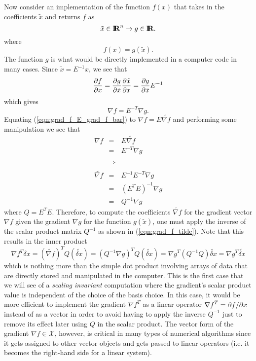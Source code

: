 Now consider an implementation of the function $f(x)$ that takes in the coefficients
$\tilde{x}$ and returns $f$ as
%
\[
\tilde{x}\in\mbox{\textbf{I}}\hspace{-0.6ex}\mbox{\textbf{R}}^n \rightarrow g\in\mbox{\textbf{I}}\hspace{-0.6ex}\mbox{\textbf{R}}.
\]
%
where
%
\[
f(x) = g(\tilde{x}).
\]
%
The function $g$ is what would be directly implemented in a computer code in
many cases.  Since $\tilde{x} = E^{-1} x$, we see that
%
\[
\displaystyle{\frac{\partial f}{\partial x}} = \displaystyle{\frac{\partial g}{\partial \tilde{x}}} \displaystyle{\frac{\partial \tilde{x}}{\partial x}}  = \displaystyle{\frac{\partial g}{\partial \tilde{x}}} E^{-1}
\]
%
which gives
%
\begin{equation}
\nabla f = E^{-T} \nabla g.
\label{eqn:grad_f_E_grad_f_bar}
\end{equation}
%
Equating (\ref{eqn:grad_f_E_grad_f_bar}) to $\nabla f = E {}\tilde{\nabla f}$
and performing some manipulation we see that
%
\begin{eqnarray}
\nabla f
& = & E \tilde{\nabla f} \nonumber \\
& = & E^{-T} \nabla g \nonumber \\
& & \nonumber \\
& \Rightarrow & \nonumber \\
& & \nonumber \\
\tilde{\nabla f}
& = & E^{-1} E^{-T} \nabla g \nonumber \\
& = & (E^T E)^{-1} \nabla g \nonumber \\
& = & {Q}^{-1} \nabla g
\label{eqn:grad_f_tilde}
\end{eqnarray}
%
where $Q = E^T E$.  Therefore, to compute the coefficients
$\tilde{\nabla f}$ for the gradient vector $\nabla f$ given the gradient
$\nabla g$ for the function $g(\tilde{x})$, one must apply the inverse of the
scalar product matrix $Q^{-1}$ as shown in
(\ref{eqn:grad_f_tilde}).  Note that this results in the inner product
%
\[
{\nabla f}^T \delta x = (\tilde{\nabla f})^T Q (\tilde{\delta x})
= ({Q}^{-1} {\nabla g})^T Q (\tilde{\delta x})
= {\nabla g}^T ( {Q}^{-1} Q ) \tilde{\delta x}
= {\nabla g}^T \tilde{\delta x}
\]
%
which is nothing more than the simple dot product involving arrays of data
that are directly stored and manipulated in the computer.  This is the first
case that we will see of a {}\textit{scaling invariant} computation where the
gradient's scalar product value is independent of the choice of the basis
choice.  In this case, it would be more efficient to implement the gradient
${\nabla f}^T$ as a linear operator ${\nabla f}^T = {}\partial f / \partial x$ instead of
as a vector in order to avoid having to apply the inverse ${Q}^{-1}$ just to
remove its effect later using $Q$ in the scalar product.  The vector form of
the gradient $\nabla f\in\mathcal{X}$, however, is critical in many types of
numerical algorithms since it gets assigned to other vector objects and gets
passed to linear operators (i.e. it becomes the right-hand side for a linear
system).

